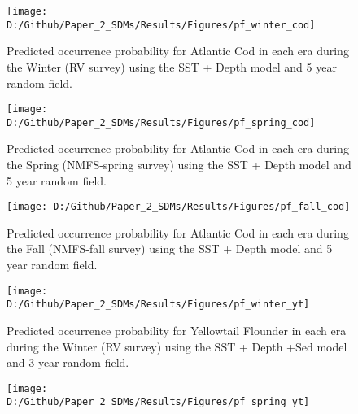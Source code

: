 \documentclass[
]{article}
\begin{document}
\begin{landscape}
\newpage
\begin{figure}[htb]

{\centering \texttt{[image: D:/Github/Paper\_2\_SDMs/Results/Figures/pf\_winter\_cod]} 

}

\caption{Predicted occurrence probability for Atlantic Cod  in each era during the Winter (RV survey) using the SST + Depth model and 5 year random field.}\label{fig:pf-winter-cod}
\end{figure}

\newpage
\begin{figure}[htb]

{\centering \texttt{[image: D:/Github/Paper\_2\_SDMs/Results/Figures/pf\_spring\_cod]} 

}

\caption{Predicted occurrence probability for Atlantic Cod  in each era during the Spring (NMFS-spring survey) using the SST + Depth model and 5 year random field.}\label{fig:pf-spring-cod}
\end{figure}

\newpage
\begin{figure}[htb]

{\centering \texttt{[image: D:/Github/Paper\_2\_SDMs/Results/Figures/pf\_fall\_cod]} 

}

\caption{Predicted occurrence probability for Atlantic Cod  in each era during the Fall (NMFS-fall survey) using the SST + Depth model and 5 year random field.}\label{fig:pf-fall-cod}
\end{figure}

\newpage
\begin{figure}[htb]

{\centering \texttt{[image: D:/Github/Paper\_2\_SDMs/Results/Figures/pf\_winter\_yt]} 

}

\caption{Predicted occurrence probability for Yellowtail Flounder in each era during the Winter (RV survey) using the SST + Depth +Sed model and 3 year random field.}\label{fig:pf-winter-yt}
\end{figure}

\newpage
\begin{figure}[htb]

{\centering \texttt{[image: D:/Github/Paper\_2\_SDMs/Results/Figures/pf\_spring\_yt]} 

}


\end{figure}
\end{landscape}
\end{document}
